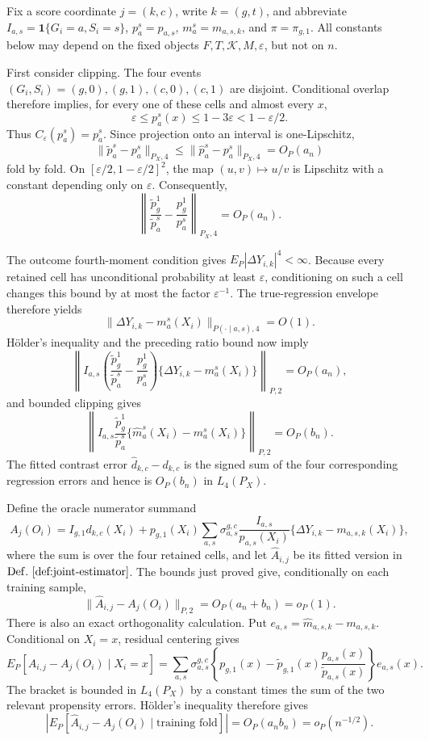 Fix a score coordinate \(j=(k,c)\), write \(k=(g,t)\), and abbreviate \(I_{a,s}=\mathbf 1\{G_i=a,S_i=s\}\), \(p_a^s=p_{a,s}\), \(m_a^s=m_{a,s,k}\), and \(\pi=\pi_{g,1}\).  All constants below may depend on the fixed objects \(F,T,\mathcal K,M,\varepsilon\), but not on \(n\).

First consider clipping.  The four events \((G_i,S_i)=(g,0),(g,1),(c,0),(c,1)\) are disjoint.  Conditional overlap therefore implies, for every one of these cells and almost every \(x\),
\[
 \varepsilon\le p_a^s(x)\le 1-3\varepsilon
 <1-\varepsilon/2.
\]
Thus \(C_\varepsilon(p_a^s)=p_a^s\).  Since projection onto an interval is one-Lipschitz,
\[
 \|\widetilde p_a^s-p_a^s\|_{P_X,4}
 \le \|\widehat p_a^s-p_a^s\|_{P_X,4}=O_P(a_n)
\]
fold by fold.  On \([\varepsilon/2,1-\varepsilon/2]^2\), the map \((u,v)\mapsto u/v\) is Lipschitz with a constant depending only on \(\varepsilon\).  Consequently,
\[
 \left\|\frac{\widetilde p_g^1}{\widetilde p_a^s}
       -\frac{p_g^1}{p_a^s}\right\|_{P_X,4}=O_P(a_n).
\]

The outcome fourth-moment condition gives \(E_P|\Delta Y_{i,k}|^4<\infty\).  Because every retained cell has unconditional probability at least \(\varepsilon\), conditioning on such a cell changes this bound by at most the factor \(\varepsilon^{-1}\).  The true-regression envelope therefore yields
\[
 \|\Delta Y_{i,k}-m_a^s(X_i)\|_{P(\cdot\mid a,s),4}=O(1).
\]
Hölder's inequality and the preceding ratio bound now imply
\[
 \left\|I_{a,s}\left(
 \frac{\widetilde p_g^1}{\widetilde p_a^s}
 -\frac{p_g^1}{p_a^s}\right)
 \{\Delta Y_{i,k}-m_a^s(X_i)\}\right\|_{P,2}=O_P(a_n),
\]
and bounded clipping gives
\[
 \left\|I_{a,s}\frac{\widetilde p_g^1}{\widetilde p_a^s}
 \{\widehat m_a^s(X_i)-m_a^s(X_i)\}\right\|_{P,2}=O_P(b_n).
\]
The fitted contrast error \(\widehat d_{k,c}-d_{k,c}\) is the signed sum of the four corresponding regression errors and hence is \(O_P(b_n)\) in \(L_4(P_X)\).

Define the oracle numerator summand
\[
 A_j(O_i)=I_{g,1}d_{k,c}(X_i)
 +p_{g,1}(X_i)
 \sum_{a,s}\sigma_{a,s}^{g,c}
 \frac{I_{a,s}}{p_{a,s}(X_i)}
 \{\Delta Y_{i,k}-m_{a,s,k}(X_i)\},
\]
where the sum is over the four retained cells, and let \(\widehat A_{i,j}\) be its fitted version in \(\mathrm{Def.}\ \ref{def:joint-estimator}\).  The bounds just proved give, conditionally on each training sample,
\[
 \|\widehat A_{i,j}-A_j(O_i)\|_{P,2}=O_P(a_n+b_n)=o_P(1).
\]
There is also an exact orthogonality calculation.  Put \(e_{a,s}=\widehat m_{a,s,k}-m_{a,s,k}\).  Conditional on \(X_i=x\), residual centering gives
\[
 E_P[\widehat A_{i,j}-A_j(O_i)\mid X_i=x]
 =\sum_{a,s}\sigma_{a,s}^{g,c}
 \left\{p_{g,1}(x)-\widetilde p_{g,1}(x)
              \frac{p_{a,s}(x)}{\widetilde p_{a,s}(x)}\right\}e_{a,s}(x).
\]
The bracket is bounded in \(L_4(P_X)\) by a constant times the sum of the two relevant propensity errors.  Hölder's inequality therefore gives
\[
 \left|E_P[\widehat A_{i,j}-A_j(O_i)\mid\text{training fold}]\right|
 =O_P(a_nb_n)=o_P(n^{-1/2}).
\]

